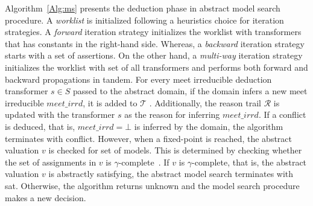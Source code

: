 Algorithm~\ref{Alg:ms} presents the deduction phase in abstract model
search procedure. 
A {\em worklist} is initialized following a heuristics choice for iteration 
strategies. A {\em forward} iteration strategy initializes the worklist with 
transformers that has constants in the right-hand side. Whereas, a {\em backward} 
iteration strategy starts with a set of assertions. On the other hand, a 
{\em multi-way} iteration strategy initializes the worklist with set of all 
transformers and performs both forward and backward propagations in tandem.  
For every meet irreducible deduction transformer  $s \in S$ 
passed to the abstract domain, if the domain infers a new meet irreducible 
$\mathit{meet\_irrd}$, it is added to $\mathcal{T}$ .  Additionally, the reason 
trail $\mathcal{R}$  is updated with the transformer $s$ as the reason for inferring
$\mathit{meet\_irrd}$. If a conflict is deduced, that is, $\mathit{meet\_irrd} = \bot$ 
is inferred by the domain, the algorithm terminates with \textsf{conflict}.  However,
when a fixed-point is reached, the abstract valuation $v$ is checked for set of
models.  This is determined by checking whether the set of assignments in $v$ is 
$\gamma$-complete~\cite{dhk2013-popl}. If $v$ is $\gamma$-complete, that is, the 
abstract valuation $v$ is abstractly satisfying, the abstract model 
search terminates with \textsf{sat}.  Otherwise, the algorithm returns \textsf{unknown} and the 
model search procedure makes a new decision.    



